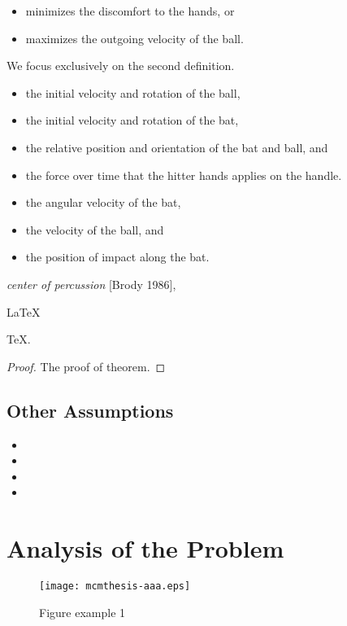 \documentclass{mcmthesis}
\begin{document}
    \begin{itemize}
    \item minimizes the discomfort to the hands, or
    \item maximizes the outgoing velocity of the ball.
    \end{itemize}
    We focus exclusively on the second definition.

    \begin{itemize}
    \item the initial velocity and rotation of the ball,
    \item the initial velocity and rotation of the bat,
    \item the relative position and orientation of the bat and ball, and
    \item the force over time that the hitter hands applies on the handle.
    \end{itemize}
    \begin{itemize}
    \item the angular velocity of the bat,
    \item the velocity of the ball, and
    \item the position of impact along the bat.
    \end{itemize}
    \emph{center of percussion} [Brody 1986],

    \begin{Theorem} \label{thm:latex}
    \LaTeX
    \end{Theorem}
    \begin{Lemma} \label{thm:tex}
    \TeX .
    \end{Lemma}
    \begin{proof}
    The proof of theorem.
    \end{proof}

    \subsection{Other Assumptions}

    \begin{itemize}
    \item
    \item
    \item
    \item
    \end{itemize}



\section{Analysis of the Problem}
\begin{figure}[h]
\centering
\texttt{[image: mcmthesis-aaa.eps]}
\caption{Figure example 1} \label{fig:aa}
\end{figure}
\end{document}
